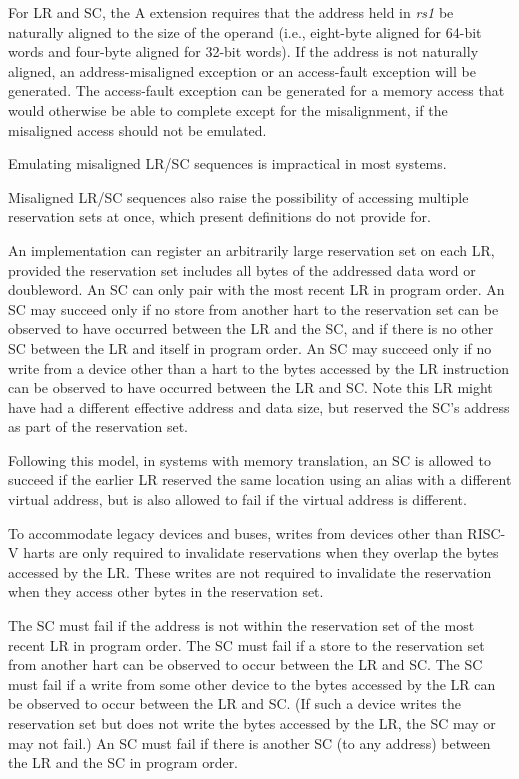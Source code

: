 For LR and SC, the A extension requires that the address held in {\em
  rs1} be naturally aligned to the size of the operand (i.e.,
eight-byte aligned for 64-bit words and four-byte aligned for 32-bit
words).  If the address is not naturally aligned, an address-misaligned
exception or an access-fault exception will be generated.  The access-fault
exception can be generated for a memory access that would otherwise be
able to complete except for the misalignment, if the misaligned access
should not be emulated.

\begin{commentary}
Emulating misaligned LR/SC sequences is impractical in most systems.

Misaligned LR/SC sequences also raise the possibility of accessing multiple
reservation sets at once, which present definitions do not provide for.
\end{commentary}

An implementation can register an arbitrarily large reservation set on each
LR, provided the reservation set includes all bytes of the addressed data word
or doubleword.
An SC can only pair with the most recent LR in program order.
An SC may succeed only if no store from another hart
to the reservation set can be observed to have occurred between the LR
and the SC, and if there is no other SC between the LR and itself in program
order.
An SC may succeed only if no write from a device other than a hart
to the bytes accessed by the LR instruction can be observed to have occurred
between the LR and SC.
Note this LR might have had a different effective address and data size, but
reserved the SC's address as part of the reservation set.
\begin{commentary}
Following this model, in systems with memory translation, an SC is allowed to
succeed if the earlier LR reserved the same location using an alias with
a different virtual address, but is also allowed to fail if the virtual
address is different.
\end{commentary}
\begin{commentary}
To accommodate legacy devices and buses, writes from devices other than RISC-V
harts are only required to invalidate reservations when they overlap the bytes
accessed by the LR.  These writes are not required to invalidate the
reservation when they access other bytes in the reservation set.
\end{commentary}

The SC must fail if the address is not within the reservation set of the most
recent LR in program order.
The SC must fail if a store to the reservation set from another hart can be
observed to occur between the LR and SC.
The SC must fail if a write from some other device to the bytes accessed by
the LR can be observed to occur between the LR and SC.
(If such a device writes the reservation set but does not write the bytes
accessed by the LR, the SC may or may not fail.)
An SC must fail if there is another SC (to any address) between the LR and the
SC in program order.

